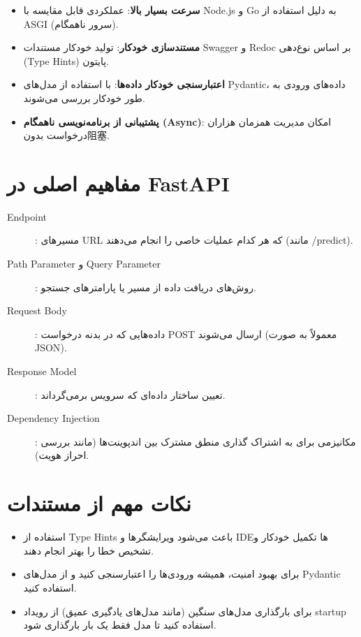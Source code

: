 \documentclass[12pt,a4paper]{report}
\newcommand{\eng}[1]{\textenglish{#1}}
\begin{document}
	\begin{itemize}
		\item \textbf{سرعت بسیار بالا}: عملکردی قابل مقایسه با \eng{Node.js} و \eng{Go} به دلیل استفاده از \eng{ASGI} (سرور ناهمگام).
		\item \textbf{مستندسازی خودکار}: تولید خودکار مستندات \eng{Swagger} و \eng{Redoc} بر اساس نوع‌دهی (\eng{Type Hints}) پایتون.
		\item \textbf{اعتبارسنجی خودکار داده‌ها}: با استفاده از مدل‌های \eng{Pydantic}، داده‌های ورودی به طور خودکار بررسی می‌شوند.
		\item \textbf{پشتیبانی از برنامه‌نویسی ناهمگام (\eng{Async})}: امکان مدیریت همزمان هزاران درخواست بدون阻塞.
	\end{itemize}
	
	\section{مفاهیم اصلی در FastAPI}
	\begin{description}
		\item[\eng{Endpoint}] : مسیرهای \eng{URL} که هر کدام عملیات خاصی را انجام می‌دهند (مانند \eng{/predict}).
		\item[\eng{Path Parameter} و \eng{Query Parameter}] : روش‌های دریافت داده از مسیر یا پارامترهای جستجو.
		\item[\eng{Request Body}] : داده‌هایی که در بدنه درخواست \eng{POST} ارسال می‌شوند (معمولاً به صورت \eng{JSON}).
		\item[\eng{Response Model}] : تعیین ساختار داده‌ای که سرویس برمی‌گرداند.
		\item[\eng{Dependency Injection}] : مکانیزمی برای به اشتراک گذاری منطق مشترک بین اندپوینت‌ها (مانند بررسی احراز هویت).
	\end{description}
	
	\section{نکات مهم از مستندات}
	\begin{itemize}
		\item استفاده از \eng{Type Hints} باعث می‌شود ویرایشگرها و \eng{IDE}ها تکمیل خودکار و تشخیص خطا را بهتر انجام دهند.
		\item برای بهبود امنیت، همیشه ورودی‌ها را اعتبارسنجی کنید و از مدل‌های \eng{Pydantic} استفاده کنید.
		\item برای بارگذاری مدل‌های سنگین (مانند مدل‌های یادگیری عمیق) از رویداد \eng{startup} استفاده کنید تا مدل فقط یک بار بارگذاری شود.
	\end{itemize}
	
\end{document}
